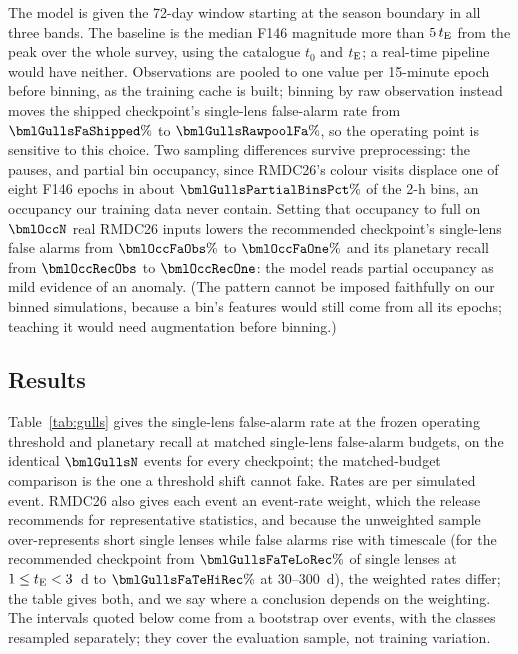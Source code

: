 The model is given the 72-day window starting at the season boundary in all three bands. The
baseline is the median F146 magnitude more than $5\,t_{\rm E}$ from the peak over the whole survey,
using the catalogue $t_0$ and $t_{\rm E}$; a real-time pipeline would have neither. Observations are pooled
to one value per 15-minute epoch before binning, as the training cache is built; binning by raw
observation instead moves the shipped checkpoint's single-lens false-alarm rate from $\bmlGullsFaShipped\%$
to $\bmlGullsRawpoolFa\%$, so the operating point is sensitive to this choice. Two sampling differences survive preprocessing:
the pauses, and partial bin occupancy, since RMDC26's colour visits displace one of eight F146 epochs
in about $\bmlGullsPartialBinsPct\%$ of the 2-h bins, an occupancy our training data never contain.
Setting that occupancy to full on $\bmlOccN$ real RMDC26 inputs lowers the recommended checkpoint's
single-lens false alarms from $\bmlOccFaObs\%$ to $\bmlOccFaOne\%$ and its planetary recall from
$\bmlOccRecObs$ to $\bmlOccRecOne$: the model reads partial occupancy as mild evidence of an anomaly.
(The pattern cannot be imposed faithfully on our binned simulations, because a bin's features would
still come from all its epochs; teaching it would need augmentation before binning.)

\subsection{Results}\label{sec:gulls:results}

Table~\ref{tab:gulls} gives the single-lens false-alarm rate at the frozen operating threshold and
planetary recall at matched single-lens false-alarm budgets, on the identical $\bmlGullsN$ events for
every checkpoint; the matched-budget comparison is the one a threshold shift cannot fake. Rates are per
simulated event. RMDC26 also gives each event an event-rate weight, which the release recommends for
representative statistics, and because the unweighted sample
over-represents short single lenses while false alarms rise with timescale (for the recommended checkpoint
from $\bmlGullsFaTeLoRec\%$ of single lenses at $1 \le t_{\rm E} < 3$~d to $\bmlGullsFaTeHiRec\%$ at
30--300~d), the weighted rates differ; the table gives both, and we say where a conclusion depends on
the weighting. The intervals quoted below come from a bootstrap over events, with the classes resampled
separately; they cover the evaluation sample, not training variation.

